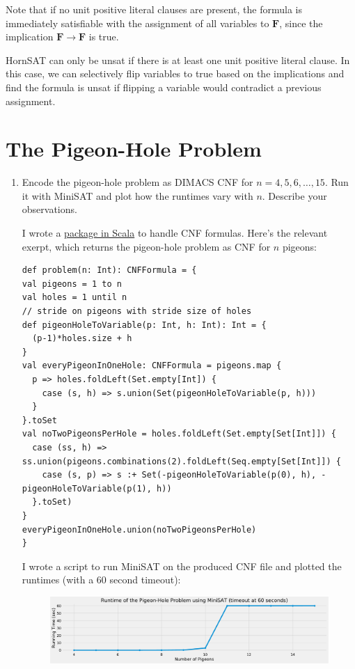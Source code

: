 \begin{enumerate}[label=(\alph*)]
    Note that if no unit positive literal clauses are present, the formula is immediately satisfiable with the assignment of all variables to $\mathbf{F}$, since the implication $\mathbf{F} \rightarrow \mathbf{F}$ is true.

    HornSAT can only be unsat if there is at least one unit positive literal clause. In this case, we can selectively flip variables to true based on the implications and find the formula is unsat if flipping a variable would contradict a previous assignment.
\end{enumerate}

\section{The Pigeon-Hole Problem}
\begin{enumerate}[label=(\alph*)]
    \item {\color{blue} Encode the pigeon-hole problem as DIMACS CNF for $n = 4, 5, 6, \dots, 15$. Run it with MiniSAT and plot how the runtimes vary with $n$. Describe your observations.}

    I wrote a \href{https://github.com/vighneshiyer/ee219c-formal/blob/master/formal-toolkit/src/main/scala/formal/PigeonHoleProblem.scala}{package in Scala} to handle CNF formulas. Here's the relevant exerpt, which returns the pigeon-hole problem as CNF for $n$ pigeons:

        \begin{verbatim}
def problem(n: Int): CNFFormula = {
val pigeons = 1 to n
val holes = 1 until n
// stride on pigeons with stride size of holes
def pigeonHoleToVariable(p: Int, h: Int): Int = {
  (p-1)*holes.size + h
}
val everyPigeonInOneHole: CNFFormula = pigeons.map {
  p => holes.foldLeft(Set.empty[Int]) {
    case (s, h) => s.union(Set(pigeonHoleToVariable(p, h)))
  }
}.toSet
val noTwoPigeonsPerHole = holes.foldLeft(Set.empty[Set[Int]]) {
  case (ss, h) => ss.union(pigeons.combinations(2).foldLeft(Seq.empty[Set[Int]]) {
    case (s, p) => s :+ Set(-pigeonHoleToVariable(p(0), h), -pigeonHoleToVariable(p(1), h))
  }.toSet)
}
everyPigeonInOneHole.union(noTwoPigeonsPerHole)
}
        \end{verbatim}

        I wrote a script to run MiniSAT on the produced CNF file and plotted the runtimes (with a 60 second timeout):

        \begin{figure}[H]
          \centering
          \includegraphics[width=\textwidth]{figs/pigeon_hole_runtime.pdf}
        \end{figure}


\end{enumerate}
